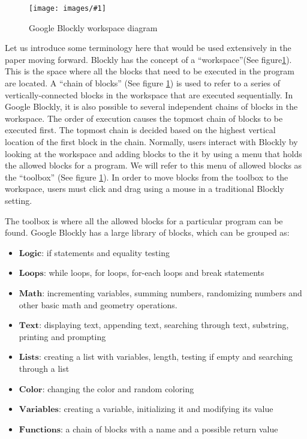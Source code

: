 \documentclass[]{article}
\newcommand\fig[3]{
\begin{figure}
  \begin{center}
  \texttt{[image: images/\#1]}
  \caption{#2} 
  \label{fig:#1}
  \end{center}
\end{figure}
}
\begin{document}
\fig{workspaceDiagram.jpg}{Google Blockly workspace diagram}{width=7cm}

Let us introduce some terminology here that would be used extensively in the paper moving forward.
Blockly has the concept of a ``workspace''(See figure\ref{fig:workspaceDiagram.jpg}). This is the space where all the blocks that need to be executed in the program are located.
A ``chain of blocks'' (See figure \ref{fig:workspaceDiagram.jpg}) is used to refer to a series of vertically-connected blocks in the workspace that are executed sequentially. 
In Google Blockly, it is also possible to several independent chains of blocks in the workspace. 
The order of execution causes the topmost chain of blocks to be executed first. 
The topmost chain is decided based on the highest vertical location of the first block in the chain. 
Normally, users interact with Blockly by looking at the workspace and adding blocks to the it by using a menu that holds the allowed blocks for a program. We will refer to this menu of allowed blocks as the  ``toolbox'' (See figure \ref{fig:workspaceDiagram.jpg}). 
In order to move blocks from the toolbox to the workspace, users must click and drag using a mouse in a traditional Blockly setting.

The toolbox is where all the allowed blocks for a particular program can be found. Google Blockly has a large library of blocks, which can be grouped as:
\begin{itemize}
  \item$\textbf{Logic}$: if statements and equality testing
  \item$\textbf{Loops}$: while loops, for loops, for-each loops and break statements
  \item$\textbf{Math}$: incrementing variables, summing numbers, randomizing numbers and other basic math and geometry operations.
  \item$\textbf{Text}$: displaying text, appending text, searching through text, substring, printing and prompting
  \item$\textbf{Lists}$: creating a list with variables, length, testing if empty and searching through a list
  \item$\textbf{Color}$: changing the color and random coloring
  \item$\textbf{Variables}$: creating a variable, initializing it and modifying its value
  \item$\textbf{Functions}$: a chain of blocks with a name and a possible return value
\end{itemize}
\end{document}
